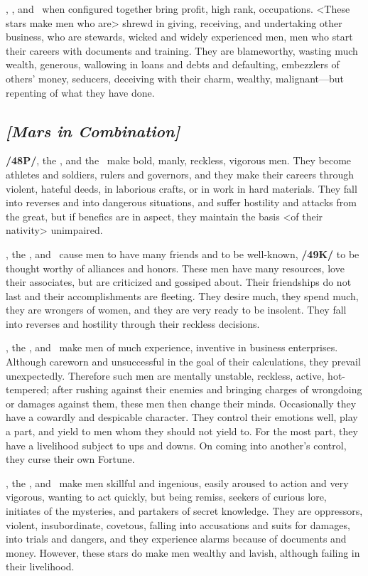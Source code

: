 \Mercury, \Mars, and \Venus\, when configured together bring profit, high rank, occupations. <These stars make men who are> shrewd in giving, receiving, and undertaking other business, who are stewards, wicked and widely experienced men, men who start their careers with documents and training. They are blameworthy, wasting much wealth, generous, wallowing in loans and debts and defaulting, embezzlers of others’ money, seducers, deceiving with their charm, wealthy, malignant—but repenting of what they have done.

\secbr
{}
\subsection{\textit{[Mars in Combination]}}
\textbf{/48P/}\Mars, the \Sun, and the \Moon\, make bold, manly, reckless, vigorous men. They become athletes and soldiers, rulers and governors, and they make their careers through violent, hateful deeds, in laborious crafts, or in work in hard materials. They fall into reverses and into dangerous situations, and suffer hostility and attacks from the great, but if benefics are in aspect, they maintain the basis <of their nativity> unimpaired.

\Mars, the \Sun, and \Venus\, cause men to have many friends and to be well-known, \textbf{/49K/} to be thought
worthy of alliances and honors. These men have many resources, love their associates, but are criticized and gossiped about. Their friendships do not last and their accomplishments are fleeting. They desire much, they spend much, they are wrongers of women, and they are very ready to be insolent. They fall
into reverses and hostility through their reckless decisions.

\Mars, the \Sun, and \Mercury\, make men of much experience, inventive in business enterprises. Although careworn and unsuccessful in the goal of their calculations, they prevail unexpectedly. Therefore such men are mentally unstable, reckless, active, hot-tempered; after rushing against their enemies and bringing charges of wrongdoing or damages against them, these men then change their minds.
Occasionally they have a cowardly and despicable character. They control their emotions well, play a part, and yield to men whom they should not yield to. For the most part, they have a livelihood subject to ups and downs. On coming into another’s control, they curse their own Fortune.

\Mars, the \Moon, and \Mercury\, make men skillful and ingenious, easily aroused to action and very vigorous, wanting to act quickly, but being remiss, seekers of curious lore, initiates of the mysteries, and partakers of secret knowledge. They are oppressors, violent, insubordinate, covetous, falling into accusations and suits for damages, into trials and dangers, and they experience alarms because of documents
and money. However, these stars do make men wealthy and lavish, although failing in their livelihood. 

